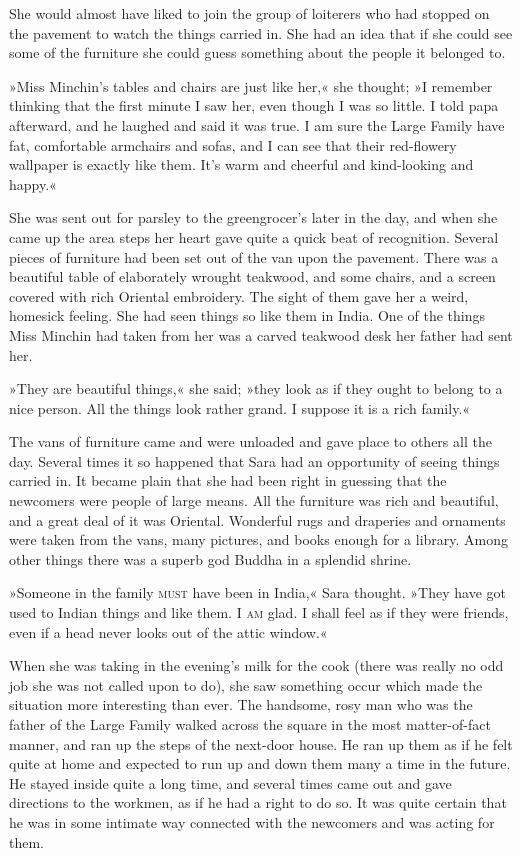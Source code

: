 She would almost have liked to join the group of loiterers who had stopped on the pavement to watch the things carried in. She had an idea that if she could see some of the furniture she could guess something about the people it belonged to.

»Miss Minchin's tables and chairs are just like her,« she thought; »I remember thinking that the first minute I saw her, even though I was so little. I told papa afterward, and he laughed and said it was true. I am sure the Large Family have fat, comfortable armchairs and sofas, and I can see that their red-flowery wallpaper is exactly like them. It's warm and cheerful and kind-looking and happy.«

She was sent out for parsley to the greengrocer's later in the day, and when she came up the area steps her heart gave quite a quick beat of recognition. Several pieces of furniture had been set out of the van upon the pavement. There was a beautiful table of elaborately wrought teakwood, and some chairs, and a screen covered with rich Oriental embroidery. The sight of them gave her a weird, homesick feeling. She had seen things so like them in India. One of the things Miss Minchin had taken from her was a carved teakwood desk her father had sent her.

»They are beautiful things,« she said; »they look as if they ought to belong to a nice person. All the things look rather grand. I suppose it is a rich family.«

The vans of furniture came and were unloaded and gave place to others all the day. Several times it so happened that Sara had an opportunity of seeing things carried in. It became plain that she had been right in guessing that the newcomers were people of large means. All the furniture was rich and beautiful, and a great deal of it was Oriental. Wonderful rugs and draperies and ornaments were taken from the vans, many pictures, and books enough for a library. Among other things there was a superb god Buddha in a splendid shrine.

»Someone in the family \textsc{must} have been in India,« Sara thought. »They have got used to Indian things and like them. I \textsc{am} glad. I shall feel as if they were friends, even if a head never looks out of the attic window.«

When she was taking in the evening's milk for the cook (there was really no odd job she was not called upon to do), she saw something occur which made the situation more interesting than ever. The handsome, rosy man who was the father of the Large Family walked across the square in the most matter-of-fact manner, and ran up the steps of the next-door house. He ran up them as if he felt quite at home and expected to run up and down them many a time in the future. He stayed inside quite a long time, and several times came out and gave directions to the workmen, as if he had a right to do so. It was quite certain that he was in some intimate way connected with the newcomers and was acting for them.

